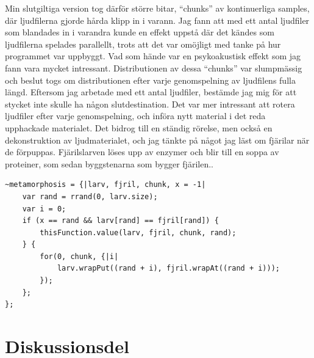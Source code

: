\documentclass{article}
\renewcommand{\baselinestretch}{1.5}
\begin{document}
Min slutgiltiga version tog därför större bitar, ``chunks'' av kontinuerliga samples, där ljudfilerna gjorde
hårda klipp in i varann. Jag fann att med ett antal ljudfiler som blandades in i varandra kunde en effekt
uppstå där det kändes som ljudfilerna spelades parallellt, trots att det var omöjligt med tanke på hur
programmet var uppbyggt. Vad som hände var en psykoakustisk effekt som jag fann vara mycket intressant.
Distributionen av dessa ``chunks'' var slumpmässig och beslut togs om distributionen efter varje genomspelning
av ljudfilens fulla längd. Eftersom jag arbetade med ett antal ljudfiler, bestämde jag mig för att stycket
inte skulle ha någon slutdestination. Det var mer intressant att rotera ljudfiler efter varje genomspelning,
och införa nytt material i det reda upphackade materialet. Det bidrog till en ständig rörelse, men också en
dekonstruktion av ljudmaterialet, och jag tänkte på något jag läst om fjärilar när de förpuppas. Fjärilslarven
löses upp av enzymer och blir till en soppa av proteiner, som sedan byggstenarna som bygger fjärilen..

\renewcommand{\baselinestretch}{1}
\begin{lstlisting}[style=SuperCollider-IDE, caption=Funktion från \emph{Metamorfos}]
~metamorphosis = {|larv, fjril, chunk, x = -1|
	var rand = rrand(0, larv.size);
	var i = 0;
	if (x == rand && larv[rand] == fjril[rand]) {
		thisFunction.value(larv, fjril, chunk, rand);
	} {
		for(0, chunk, {|i|
			larv.wrapPut((rand + i), fjril.wrapAt((rand + i)));
		});
	};
};
\end{lstlisting}
\renewcommand{\baselinestretch}{1.5}

\section{Diskussionsdel}

\end{document}
